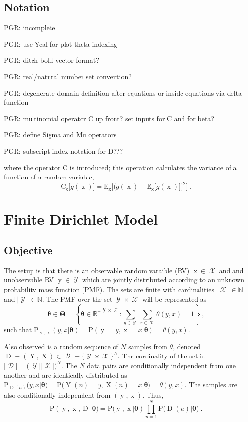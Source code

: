 \documentclass[12pt]{report}
\DeclareMathOperator{\xrm}{\mathrm{x}}
\DeclareMathOperator{\Xrm}{\mathrm{X}}
\DeclareMathOperator{\yrm}{\mathrm{y}}
\DeclareMathOperator{\Yrm}{\mathrm{Y}}
\DeclareMathOperator{\Drm}{\mathrm{D}}
\DeclareMathOperator{\Xcal}{\mathcal{X}}
\DeclareMathOperator{\Ycal}{\mathcal{Y}}
\DeclareMathOperator{\Dcal}{\mathcal{D}}
\begin{document}
\section{Notation}

PGR: incomplete

PGR: use Ycal for plot theta indexing

PGR: ditch bold vector format?

PGR: real/natural number set convention?

PGR: degenerate domain definition after equations or inside equations via delta function

PGR: multinomial operator C up front? set inputs for C and for beta?

PGR: define Sigma and Mu operators

PGR: subscript index notation for D???

where the operator $\text{C}$ is introduced; this operation calculates the variance of a function of a random variable, 
\begin{equation}
\text{C}_{\xrm}\big[g(\xrm)\big] = \text{E}_{\xrm} \bigg[ \Big( g(\xrm) - \text{E}_{\xrm}\big[g(\xrm)\big] \Big)^2 \bigg] \;.
\end{equation}



\chapter{Finite Dirichlet Model}


\section{Objective}

The setup is that there is an observable random varaible (RV) $\xrm \in \Xcal$ and and unobservable RV $\yrm \in \Ycal$ which are jointly distributed according to an unknown probability mass function (PMF). The sets are finite with cardinalities $|\Xcal| \in \mathbb{N}$ and $|\Ycal| \in \mathbb{N}$. The PMF over the set $\Ycal \times \Xcal $ will be represented as
\begin{equation}
\bm{\theta} \in \bm{\Theta} = \left\{ \bm{\theta} \in {\mathbb{R}^+}^{\Ycal \times \Xcal}: \sum_{y \in \Ycal} \sum_{x \in \Xcal}  \theta(y,x) = 1 \right\} \;,
\end{equation}
such that $\text{P}_{\yrm,\xrm}(y,x | \bm{\theta}) = \text{P}(\yrm = y, \xrm = x | \bm{\theta}) = \theta(y,x)$.

Also observed is a random sequence of $N$ samples from $\theta$, denoted $\Drm = ( \Yrm,\Xrm ) \in \Dcal = \{\Ycal \times \Xcal\}^N$. The cardinality of the set is $|\Dcal| = \big( |\Ycal| |\Xcal| \big)^N$. The $N$ data pairs are conditionally independent from one another and are identically distributed as $\text{P}_{\Drm(n)}(y,x | \bm{\theta}) = \text{P}\big( \Yrm(n) = y, \Xrm(n) = x | \bm{\theta} \big) = \theta(y,x)$. The samples are also conditionally independent from $(\yrm,\xrm)$. Thus,
\begin{equation}
\text{P}(\yrm,\xrm,\Drm | \bm{\theta}) = \text{P}(\yrm,\xrm | \bm{\theta}) \prod_{n=1}^N \text{P}\big( \Drm(n) | \bm{\theta} \big) \;.
\end{equation}
\end{document}
